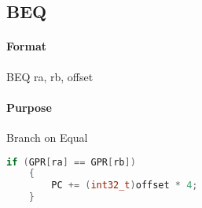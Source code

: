 \subsection{BEQ}


\paragraph{Format} BEQ ra, rb, offset

\paragraph{Purpose} Branch on Equal

\begin{lstlisting}[language=c]
    if (GPR[ra] == GPR[rb])
    {
        PC += (int32_t)offset * 4;
    }
\end{lstlisting}
